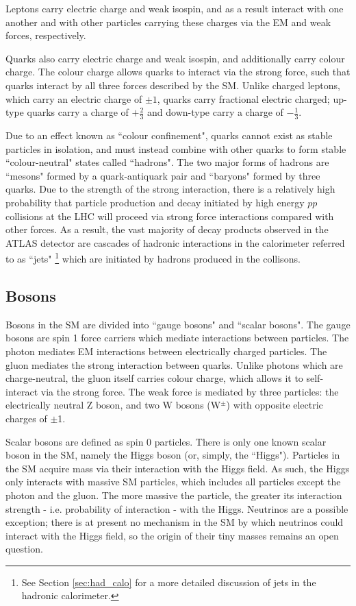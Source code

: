 Leptons carry electric charge and weak isospin, and as a result interact with one another and with other particles carrying these charges via the EM and weak forces, respectively.  

Quarks also carry electric charge and weak isospin, and additionally carry colour charge. The colour charge allows quarks to interact via the strong force, such that quarks interact by all three forces described by the SM. Unlike charged leptons, which carry an electric charge of \(\pm1\), quarks carry fractional electric charged; up-type quarks carry a charge of \(+\frac{2}{3}\) and down-type carry a charge of \(-\frac{1}{3}\).

Due to an effect known as ``colour confinement", quarks cannot exist as stable particles in isolation, and must instead combine with other quarks to form stable ``colour-neutral" states called ``hadrons". The two major forms of hadrons are ``mesons" formed by a quark-antiquark pair and ``baryons" formed by three quarks. Due to the strength of the strong interaction, there is a relatively high probability that particle production and decay initiated by high energy $pp$ collisions at the LHC will proceed via strong force interactions compared with other forces. As a result, the vast majority of decay products observed in the ATLAS detector are cascades of hadronic interactions in the calorimeter referred to as ``jets" \footnote{See Section \ref{sec:had_calo} for a more detailed discussion of jets in the hadronic calorimeter.} which are initiated by hadrons produced in the collisons.

\subsection{Bosons}

Bosons in the SM are divided into ``gauge bosons" and ``scalar bosons". The gauge bosons are spin 1 force carriers which mediate interactions between particles. The photon mediates EM interactions between electrically charged particles. The gluon mediates the strong interaction between quarks. Unlike photons which are charge-neutral, the gluon itself carries colour charge, which allows it to self-interact via the strong force. The weak force is mediated by three particles: the electrically neutral Z boson, and two W bosons (W$^\pm$) with opposite electric charges of $\pm$1. 

Scalar bosons are defined as spin 0 particles. There is only one known scalar boson in the SM, namely the Higgs boson (or, simply, the ``Higgs"). Particles in the SM acquire mass via their interaction with the Higgs field. As such, the Higgs only interacts with massive SM particles, which includes all particles except the photon and the gluon. The more massive the particle, the greater its interaction strength - i.e. probability of interaction - with the Higgs. Neutrinos are a possible exception; there is at present no mechanism in the SM by which neutrinos could interact with the Higgs field, so the origin of their tiny masses remains an open question.  

